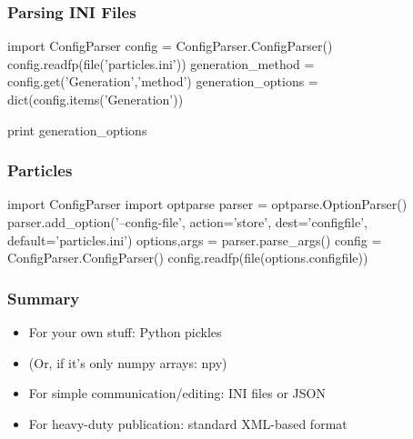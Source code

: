 \begin{frame}[fragile]
\frametitle{Parsing INI Files}

\begin{python}
import ConfigParser
config = ConfigParser.ConfigParser()
config.readfp(file('particles.ini'))
generation_method = config.get('Generation','method')
generation_options = dict(config.items('Generation'))

print generation_options
\end{python}
\end{frame}

\begin{frame}[fragile]
\frametitle{Particles}

\begin{python}
import ConfigParser
import optparse
parser = optparse.OptionParser()
parser.add_option('--config-file',
                action='store',
                dest='configfile',
                default='particles.ini')
options,args = parser.parse_args()
config = ConfigParser.ConfigParser()
config.readfp(file(options.configfile))
\end{python}
\end{frame}

\begin{frame}[fragile]
\frametitle{Summary}

\begin{itemize}
\item For your own stuff: Python pickles
\item (Or, if it's only numpy arrays: npy)
\item For simple communication/editing: INI files or JSON
\item For heavy-duty publication: standard XML-based format
\end{itemize}
\end{frame}


